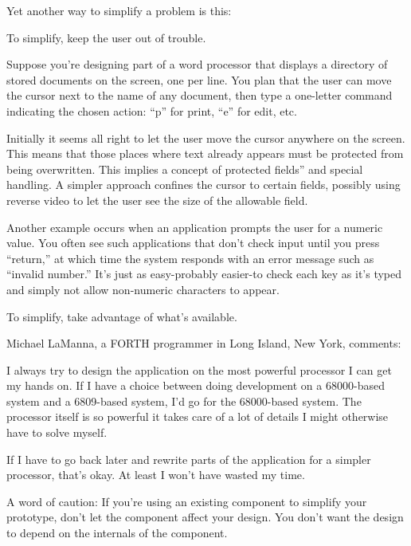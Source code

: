 Yet another way to simplify a problem is this:

\begin{tip}
To simplify, keep the user out of trouble.
\end{tip}

\noindent Suppose you're designing part of a word processor that displays a
directory of stored documents on the screen, one per line. You plan that the
user can move the cursor next to the name of any document, then type a
one-letter command indicating the chosen action: ``p'' for print, ``e'' for
edit, etc.

Initially it seems all right to let the user move the cursor anywhere
on the screen. This means that those places where text already appears
must be protected from being overwritten. This implies a concept of 
protected fields'' and special handling. A simpler approach confines the
cursor to certain fields, possibly using reverse video to let the user see the
size of the allowable field.

Another example occurs when an application prompts the user for a
numeric value. You often see such applications that don't check input
until you press ``return,'' at which time the system responds with an error
message such as ``invalid number.'' It's just as easy-probably easier-to
check each key as it's typed and simply not allow non-numeric characters
to appear.

\begin{tip}
To simplify, take advantage of what's available.
\end{tip}

\bigskip\blackline{2ex}
\noindent Michael LaManna, a FORTH programmer in Long Island, New York, comments:

\begin{tfquot}
\noindent I always try to design the application on the most powerful processor I can
get my hands on. If I have a choice between doing development on a
68000-based system and a 6809-based system, I'd go for the 68000-based
system. The processor itself is so powerful it takes care of a lot of details I
might otherwise have to solve myself.

If I have to go back later and rewrite parts of the application for a simpler
processor, that's okay. At least I won't have wasted my time.
\end{tfquot}
\blackline{1ex}

\noindent A word of caution: If you're using an existing component to simplify
your prototype, don't let the component affect your design. You don't
want the design to depend on the internals of the component.

